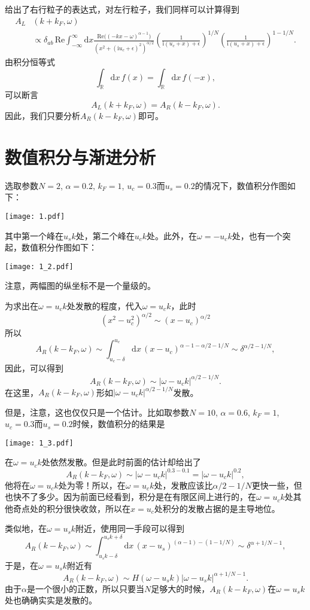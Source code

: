 \documentclass[9pt]{extarticle}
\newcommand{\ii}{\mathrm{i}}
\newcommand{\rr}{\mathbb{R}}
\newcommand{\dd}{\mathrm{d}}
\begin{document}
给出了右行粒子的表达式，对左行粒子，我们同样可以计算得到
\begin{align*}
	A_L&(k+k_F,\omega)\\
	&\propto \delta_{ab}\,\mathrm{Re}\int_{-\infty}^{\infty} \dd x \frac{\mathrm{Re}\bigl((-kx-\omega)^{\alpha-1}\bigr)}{(x^2+(\ii u_c+\epsilon)^2)^{\alpha/2}}\left(\frac{1}{\ii(u_c+x)+\epsilon}\right)^{1/N}\left(\frac{1}{\ii(u_s+x)+\epsilon}\right)^{1-1/N}.
\end{align*}
由积分恒等式
\[
	\int_\rr \dd x\, f(x)=\int_\rr \dd x\, f(-x),
\]
可以断言
\[
	A_L(k+k_F,\omega)=A_R(k-k_F,\omega).
\]
因此，我们只要分析$A_R(k-k_F,\omega)$即可。

\section{数值积分与渐进分析}

选取参数$N=2$, $\alpha=0.2$, $k_F=1$, $u_c=0.3$而$u_s=0.2$的情况下，数值积分作图如下：
\begin{center}\texttt{[image: 1.pdf]}\end{center}
其中第一个峰在$u_s k$处，第二个峰在$u_c k$处。此外，在$\omega=-u_c k$处，也有一个突起，数值积分作图如下：
\begin{center}\texttt{[image: 1\_2.pdf]}\end{center}
注意，两幅图的纵坐标不是一个量级的。

为求出在$\omega=u_c k$处发散的程度，代入$\omega=u_c k$，此时
\[
(x^2-u_c^2)^{\alpha/2}\sim (x-u_c)^{\alpha/2}
\]
所以
\[
	A_R(k-k_F,\omega)\sim \int_{u_c-\delta}^{u_c} \dd x \,(x-u_c)^{\alpha-1-\alpha/2-1/N}\sim \delta^{\alpha/2-1/N},
\]
因此，可以得到
\[
	A_R(k-k_F,\omega)\sim |\omega - u_c k|^{\alpha/2-1/N}.
\]
在这里，$A_R(k-k_F,\omega)$形如$|\omega - u_c k|^{\alpha/2-1/N}$发散。

但是，注意，这也仅仅只是一个估计。比如取参数$N=10$, $\alpha=0.6$, $k_F=1$, $u_c=0.3$而$u_s=0.2$时候，数值积分的结果是
\begin{center}\texttt{[image: 1\_3.pdf]}\end{center}
在$\omega=u_ck$处依然发散。但是此时前面的估计却给出了
\[
	A_R(k-k_F,\omega)\sim |\omega - u_c k|^{0.3-0.1}=|\omega - u_c k|^{0.2},
\]
他将在$\omega=u_ck$处为零！所以，在$\omega=u_ck$处，发散应该比$\alpha/2-1/N$更快一些，但也快不了多少。因为前面已经看到，积分是在有限区间上进行的，在$\omega=u_ck$处其他奇点处的积分很快收敛，所以在$x=u_c$处积分的发散占据的是主导地位。

类似地，在$\omega=u_s k$附近，使用同一手段可以得到
\[
	A_R(k-k_F,\omega)\sim \int_{u_s k -\delta}^{u_s k +\delta} \dd x \,(x-u_s)^{(\alpha-1)-(1-1/N)}\sim \delta^{\alpha+1/N-1},
\]
于是，在$\omega=u_s k$附近有
\[
	A_R(k-k_F,\omega)\sim H(\omega-u_s k)|\omega - u_s k|^{\alpha+1/N-1}.
\]
由于$\alpha$是一个很小的正数，所以只要当$N$足够大的时候，$A_R(k-k_F,\omega)$在$\omega=u_s k$处也确确实实是发散的。
\end{document}
